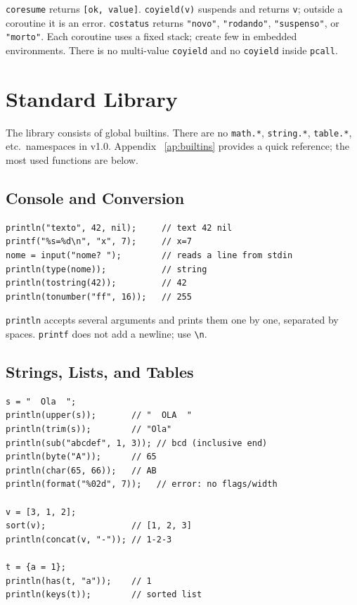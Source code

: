 \documentclass[11pt,a4paper,oneside]{report}
\newcommand{\code}[1]{\texttt{#1}}
\begin{document}
\code{coresume} returns \code{[ok, value]}. \code{coyield(v)} suspends
and returns \code{v}; outside a coroutine it is an error. \code{costatus}
returns \code{"novo"}, \code{"rodando"}, \code{"suspenso"}, or
\code{"morto"}. Each coroutine uses a fixed stack; create few in embedded
environments. There is no multi-value \code{coyield} and no
\code{coyield} inside \code{pcall}.

\chapter{Standard Library}
\label{cap:stdlib}

The library consists of global builtins. There are no \code{math.*},
\code{string.*}, \code{table.*}, etc.\ namespaces in v1.0. Appendix
~\ref{ap:builtins} provides a quick reference; the most used functions
are below.

\section{Console and Conversion}
\begin{lstlisting}
println("texto", 42, nil);     // text 42 nil
printf("%s=%d\n", "x", 7);     // x=7
nome = input("nome? ");        // reads a line from stdin
println(type(nome));           // string
println(tostring(42));         // 42
println(tonumber("ff", 16));   // 255
\end{lstlisting}

\code{println} accepts several arguments and prints them one by one,
separated by spaces. \code{printf} does not add a newline; use
\code{\textbackslash n}.

\section{Strings, Lists, and Tables}
\begin{lstlisting}
s = "  Ola  ";
println(upper(s));       // "  OLA  "
println(trim(s));        // "Ola"
println(sub("abcdef", 1, 3)); // bcd (inclusive end)
println(byte("A"));      // 65
println(char(65, 66));   // AB
println(format("%02d", 7));   // error: no flags/width

v = [3, 1, 2];
sort(v);                 // [1, 2, 3]
println(concat(v, "-")); // 1-2-3

t = {a = 1};
println(has(t, "a"));    // 1
println(keys(t));        // sorted list
\end{lstlisting}
\end{document}
